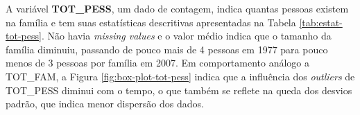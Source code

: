 \begin{table}[htb]
\centering

\end{table}

A variável \textbf{TOT_PESS}, um dado de contagem, indica quantas pessoas existem na família e tem suas estatísticas descritivas apresentadas na Tabela \ref{tab:estat-tot-pess}. Não havia \textit{missing values} e o valor médio indica que o tamanho da família diminuiu, passando de pouco mais de 4 pessoas em 1977 para pouco menos de 3 pessoas por família em 2007.
Em comportamento análogo a TOT_FAM, a Figura \ref{fig:box-plot-tot-pess} indica que a influência dos \textit{outliers} de TOT_PESS diminui com o tempo, o que também se reflete na queda dos desvios padrão, que indica menor dispersão dos dados.

